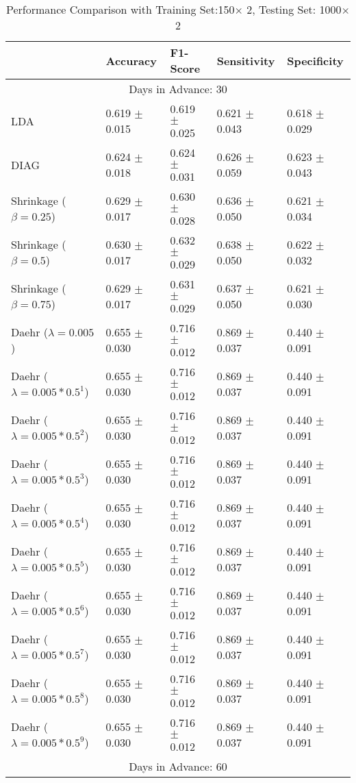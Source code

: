 \begin{table}
\caption{Performance Comparison with Training Set:150$\times$ 2, Testing Set: 1000$\times$2}
\footnotesize
\centering
\begin{tabular}{*{5}{l}}
\toprule
 & Accuracy & F1-Score & Sensitivity & Specificity\\
\hline\multicolumn{5}{c}{  Days in Advance: 30}\\\hline
LDA&0.619 $\pm$ 0.015&0.619 $\pm$ 0.025&0.621 $\pm$ 0.043&0.618 $\pm$ 0.029\\
DIAG&0.624 $\pm$ 0.018&0.624 $\pm$ 0.031&0.626 $\pm$ 0.059&0.623 $\pm$ 0.043\\
Shrinkage ($\beta=0.25$)&0.629 $\pm$ 0.017&0.630 $\pm$ 0.028&0.636 $\pm$ 0.050&0.621 $\pm$ 0.034\\
Shrinkage ($\beta=0.5$)&0.630 $\pm$ 0.017&0.632 $\pm$ 0.029&0.638 $\pm$ 0.050&0.622 $\pm$ 0.032\\
Shrinkage ($\beta=0.75$)&0.629 $\pm$ 0.017&0.631 $\pm$ 0.029&0.637 $\pm$ 0.050&0.621 $\pm$ 0.030\\
Daehr ($\lambda=0.005$)&0.655 $\pm$ 0.030&0.716 $\pm$ 0.012&0.869 $\pm$ 0.037&0.440 $\pm$ 0.091\\
Daehr ($\lambda=0.005*0.5^1$)&0.655 $\pm$ 0.030&0.716 $\pm$ 0.012&0.869 $\pm$ 0.037&0.440 $\pm$ 0.091\\
Daehr ($\lambda=0.005*0.5^2$)&0.655 $\pm$ 0.030&0.716 $\pm$ 0.012&0.869 $\pm$ 0.037&0.440 $\pm$ 0.091\\
Daehr ($\lambda=0.005*0.5^3$)&0.655 $\pm$ 0.030&0.716 $\pm$ 0.012&0.869 $\pm$ 0.037&0.440 $\pm$ 0.091\\
Daehr ($\lambda=0.005*0.5^4$)&0.655 $\pm$ 0.030&0.716 $\pm$ 0.012&0.869 $\pm$ 0.037&0.440 $\pm$ 0.091\\
Daehr ($\lambda=0.005*0.5^5$)&0.655 $\pm$ 0.030&0.716 $\pm$ 0.012&0.869 $\pm$ 0.037&0.440 $\pm$ 0.091\\
Daehr ($\lambda=0.005*0.5^6$)&0.655 $\pm$ 0.030&0.716 $\pm$ 0.012&0.869 $\pm$ 0.037&0.440 $\pm$ 0.091\\
Daehr ($\lambda=0.005*0.5^7$)&0.655 $\pm$ 0.030&0.716 $\pm$ 0.012&0.869 $\pm$ 0.037&0.440 $\pm$ 0.091\\
Daehr ($\lambda=0.005*0.5^8$)&0.655 $\pm$ 0.030&0.716 $\pm$ 0.012&0.869 $\pm$ 0.037&0.440 $\pm$ 0.091\\
Daehr ($\lambda=0.005*0.5^9$)&0.655 $\pm$ 0.030&0.716 $\pm$ 0.012&0.869 $\pm$ 0.037&0.440 $\pm$ 0.091\\
\hline\multicolumn{5}{c}{  Days in Advance: 60}\\\hline

\end{tabular}
\end{table}
